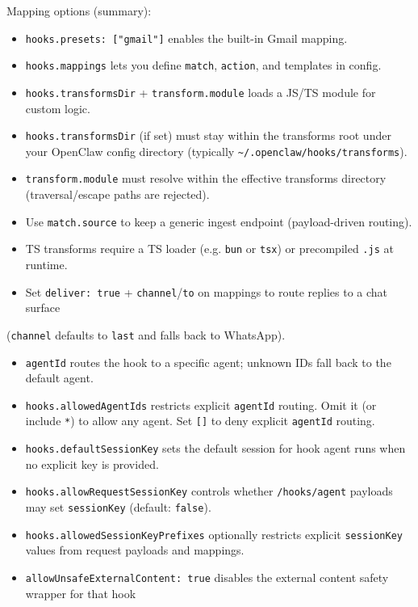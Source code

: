Mapping options (summary):

\begin{itemize}
  \item \texttt{hooks.presets: ["gmail"]} enables the built-in Gmail mapping.
  \item \texttt{hooks.mappings} lets you define \texttt{match}, \texttt{action}, and templates in config.
  \item \texttt{hooks.transformsDir} + \texttt{transform.module} loads a JS/TS module for custom logic.
  \item \texttt{hooks.transformsDir} (if set) must stay within the transforms root under your OpenClaw config directory (typically \texttt{\textasciitilde{}/.openclaw/hooks/transforms}).
  \item \texttt{transform.module} must resolve within the effective transforms directory (traversal/escape paths are rejected).
  \item Use \texttt{match.source} to keep a generic ingest endpoint (payload-driven routing).
  \item TS transforms require a TS loader (e.g. \texttt{bun} or \texttt{tsx}) or precompiled \texttt{.js} at runtime.
  \item Set \texttt{deliver: true} + \texttt{channel}/\texttt{to} on mappings to route replies to a chat surface
\end{itemize}

(\texttt{channel} defaults to \texttt{last} and falls back to WhatsApp).
\begin{itemize}
  \item \texttt{agentId} routes the hook to a specific agent; unknown IDs fall back to the default agent.
  \item \texttt{hooks.allowedAgentIds} restricts explicit \texttt{agentId} routing. Omit it (or include \texttt{*}) to allow any agent. Set \texttt{[]} to deny explicit \texttt{agentId} routing.
  \item \texttt{hooks.defaultSessionKey} sets the default session for hook agent runs when no explicit key is provided.
  \item \texttt{hooks.allowRequestSessionKey} controls whether \texttt{/hooks/agent} payloads may set \texttt{sessionKey} (default: \texttt{false}).
  \item \texttt{hooks.allowedSessionKeyPrefixes} optionally restricts explicit \texttt{sessionKey} values from request payloads and mappings.
  \item \texttt{allowUnsafeExternalContent: true} disables the external content safety wrapper for that hook
\end{itemize}


